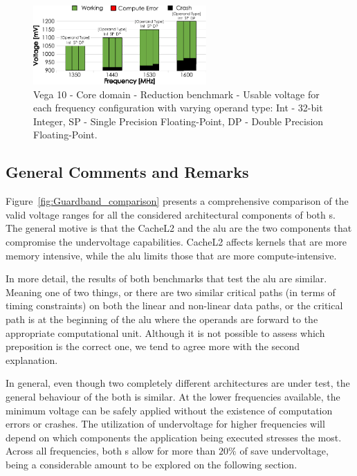 \begin{figure}[htb]
  \centering
  \includegraphics[width=0.59\textwidth]{Figures/GPU_characterization/Reduction_guardband.pdf}
  \caption{Vega 10 - Core domain - Reduction benchmark - Usable voltage for each frequency configuration with varying operand type: Int - 32-bit Integer, SP - Single Precision Floating-Point, DP - Double Precision Floating-Point.}
  \label{fig:Reduction_guardband}
\end{figure}


\subsection{General Comments and Remarks}


Figure~\ref{fig:Guardband_comparison} presents a comprehensive comparison of the valid voltage ranges for all the considered architectural components of both s. The general motive is that the CacheL2 and the \acrshort{alu} are the two components that compromise the undervoltage capabilities. CacheL2 affects kernels that are more memory intensive, while the \acrshort{alu} limits those that are more compute-intensive. 

In more detail, the results of both benchmarks that test the \acrshort{alu} are similar. Meaning one of two things, or there are two similar critical paths (in terms of timing constraints) on both the linear and non-linear data paths, or the critical path is at the beginning of the  \acrshort{alu} where the operands are forward to the appropriate computational unit. Although it is not possible to assess which preposition is the correct one, we tend to agree more with the second explanation.

In general, even though two completely different  architectures are under test, the general behaviour of the both is similar. At the lower frequencies available, the minimum voltage can be safely applied without the existence of computation errors or crashes. The utilization of undervoltage for higher frequencies will depend on which components the application being executed stresses the most. Across all frequencies, both s allow for more than $20\%$ of save undervoltage, being a considerable amount to be explored on the following section.


